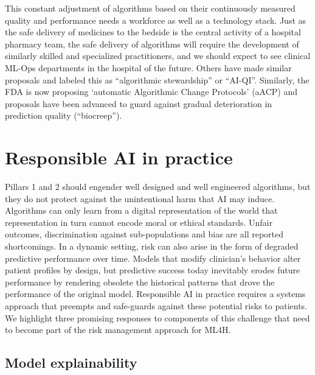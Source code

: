 This constant adjustment of algorithms based on their continuously
measured quality and performance needs a workforce as well as a
technology stack. Just as the safe delivery of medicines to the bedside
is the central activity of a hospital pharmacy team, the safe delivery
of algorithms will require the development of similarly skilled and
specialized practitioners, and we should expect to see clinical ML-Ops
departments in the hospital of the future. Others have made similar
proposals and labeled this as ``algorithmic stewardship'' or
``AI-QI''.\citep{eaneff2020, feng2022} Similarly, the FDA is now
proposing `automatic Algorithmic Change Protocols' (aACP) and proposals
have been advanced to guard against gradual deterioration in prediction
quality (``biocreep'').\citep{2021, feng2021}

\hypertarget{responsible-ai-in-practice}{%
\section{Responsible AI in practice}\label{responsible-ai-in-practice}}

Pillars 1 and 2 should engender well designed and well engineered
algorithms, but they do not protect against the unintentional harm that
AI may induce. Algorithms can only learn from a digital representation
of the world that representation in turn cannot encode moral or ethical
standards. Unfair outcomes, discrimination against sub-populations and
bias are all reported shortcomings.\citep{amodei2016} In a dynamic
setting, risk can also arise in the form of degraded predictive
performance over time. Models that modify clinician's behavior alter
patient profiles by design, but predictive success today inevitably
erodes future performance by rendering obsolete the historical patterns
that drove the performance of the original model.\citep{liley2021}
Responsible AI in practice requires a systems approach that preempts and
safe-guards against these potential risks to patients. We highlight
three promising responses to components of this challenge that need to
become part of the risk management approach for ML4H.

\hypertarget{model-explainability}{%
\subsection{Model explainability}\label{model-explainability}}


